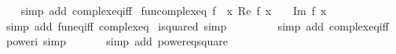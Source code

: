 \begin{isabellebody}
%
\isadelimproof
\ \ %
\endisadelimproof
%
\isatagproof
{}\isamarkupfalse%
\ {\isacharparenleft}{\kern0pt}simp\ add{\isacharcolon}{\kern0pt}\ complex{\isacharunderscore}{\kern0pt}eq{\isacharunderscore}{\kern0pt}iff{\isacharparenright}{\kern0pt}%
\endisatagproof
{\isafoldproof}%
%
\isadelimproof
\isanewline
%
\endisadelimproof
\isanewline
{}\isamarkupfalse%
\ fun{\isacharunderscore}{\kern0pt}complex{\isacharunderscore}{\kern0pt}eq{\isacharcolon}{\kern0pt}\ {\isachardoublequoteopen}f\ {\isacharequal}{\kern0pt}\ {\isacharparenleft}{\kern0pt}{\isasymlambda}x{\isachardot}{\kern0pt}\ Re\ {\isacharparenleft}{\kern0pt}f\ x{\isacharparenright}{\kern0pt}\ {\isacharplus}{\kern0pt}\ {\isasymi}\ {\isacharasterisk}{\kern0pt}\ Im\ {\isacharparenleft}{\kern0pt}f\ x{\isacharparenright}{\kern0pt}{\isacharparenright}{\kern0pt}{\isachardoublequoteclose}\isanewline
%
\isadelimproof
\ \ %
\endisadelimproof
%
\isatagproof
{}\isamarkupfalse%
\ {\isacharparenleft}{\kern0pt}simp\ add{\isacharcolon}{\kern0pt}\ fun{\isacharunderscore}{\kern0pt}eq{\isacharunderscore}{\kern0pt}iff\ complex{\isacharunderscore}{\kern0pt}eq{\isacharparenright}{\kern0pt}%
\endisatagproof
{\isafoldproof}%
%
\isadelimproof
\isanewline
%
\endisadelimproof
\isanewline
{}\isamarkupfalse%
\ i{\isacharunderscore}{\kern0pt}squared\ {\isacharbrackleft}{\kern0pt}simp{\isacharbrackright}{\kern0pt}{\isacharcolon}{\kern0pt}\ {\isachardoublequoteopen}{\isasymi}\ {\isacharasterisk}{\kern0pt}\ {\isasymi}\ {\isacharequal}{\kern0pt}\ {\isacharminus}{\kern0pt}{}{\isachardoublequoteclose}\isanewline
%
\isadelimproof
\ \ %
\endisadelimproof
%
\isatagproof
{}\isamarkupfalse%
\ {\isacharparenleft}{\kern0pt}simp\ add{\isacharcolon}{\kern0pt}\ complex{\isacharunderscore}{\kern0pt}eq{\isacharunderscore}{\kern0pt}iff{\isacharparenright}{\kern0pt}%
\endisatagproof
{\isafoldproof}%
%
\isadelimproof
\isanewline
%
\endisadelimproof
\isanewline
{}\isamarkupfalse%
\ power{}{\isacharunderscore}{\kern0pt}i\ {\isacharbrackleft}{\kern0pt}simp{\isacharbrackright}{\kern0pt}{\isacharcolon}{\kern0pt}\ {\isachardoublequoteopen}{\isasymi}\ {\isacharequal}{\kern0pt}\ {\isacharminus}{\kern0pt}{}{\isachardoublequoteclose}\isanewline
%
\isadelimproof
\ \ %
\endisadelimproof
%
\isatagproof
{}\isamarkupfalse%
\ {\isacharparenleft}{\kern0pt}simp\ add{\isacharcolon}{\kern0pt}\ power{}{\isacharunderscore}{\kern0pt}eq{\isacharunderscore}{\kern0pt}square{\isacharparenright}{\kern0pt}%
\endisatagproof

\end{isabellebody}
